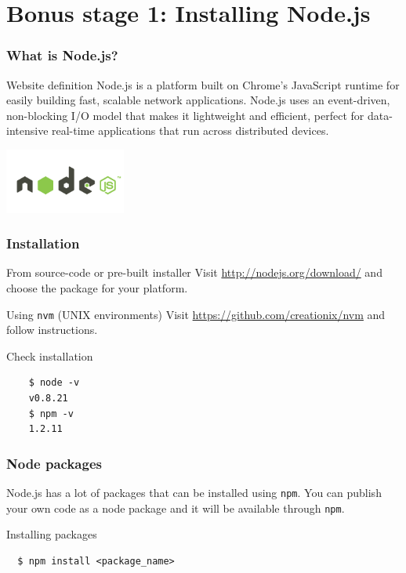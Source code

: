 \section{Bonus stage 1: Installing Node.js}

\begin{frame}[fragile]
\end{frame}

\begin{frame}[fragile]
  \frametitle{What is Node.js?}
  \begin{block}{Website definition}
    Node.js is a platform built on Chrome's JavaScript runtime for easily building fast, scalable network applications. Node.js uses an event-driven, non-blocking I/O model that makes it lightweight and efficient, perfect for data-intensive real-time applications that run across distributed devices.
  \end{block}

  \begin{center}
    \includegraphics[width=150px]{images/nodejs.png}
  \end{center}
\end{frame}

\begin{frame}[fragile]
  \frametitle{Installation}
  \begin{block}{From source-code or pre-built installer}
    Visit \url{http://nodejs.org/download/} and choose the package for your platform.
  \end{block}

  \pause

  \begin{block}{Using \texttt{nvm} (UNIX environments)}
    Visit \url{https://github.com/creationix/nvm} and follow instructions.
  \end{block}

  \pause

  \begin{block}{Check installation}
    {\scriptsize
    \begin{verbatim}
    $ node -v
    v0.8.21
    $ npm -v
    1.2.11
    \end{verbatim}
    }
  \end{block}
\end{frame}

\begin{frame}[fragile]
  \frametitle{Node packages}

  Node.js has a lot of packages that can be installed using \texttt{npm}. 
  You can publish your own code as a node package and it will be available through \texttt{npm}.

  \pause

  \begin{block}{Installing packages}
  {\scriptsize
  \begin{verbatim}
  $ npm install <package_name>
  \end{verbatim}
  }
  \end{block}
\end{frame}
